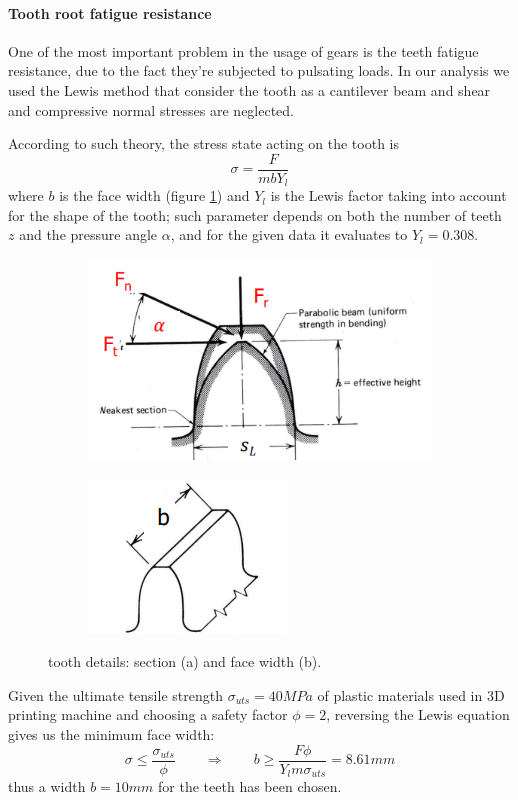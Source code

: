 	\paragraph{Tooth root fatigue resistance}	One of the most important problem in the usage of gears is the teeth fatigue resistance, due to the fact they're subjected to pulsating loads.  
	In our analysis we used the Lewis method that consider the tooth as a cantilever beam and shear and compressive normal stresses are neglected.
	
	According to such theory, the stress state acting on the tooth is
	\[ \sigma = \frac{F}{mb Y_l}\]
	where $b$ is the face width (figure \ref{fig:tooth}) and $Y_l$ is the Lewis factor taking into account for the shape of the tooth; such parameter depends on both the number of teeth $z$ and the pressure angle $\alpha$, and for the given data it evaluates to $Y_l = 0.308$.
	\begin{figure}[bt]
	\begin{subfigure}{.5\textwidth}
		\centering
		\includegraphics[scale=0.5]{Images/toothgear1.png}
		\caption{}
	\end{subfigure}%
	\begin{subfigure}{.5\textwidth}
		\centering
		\includegraphics[scale=0.6]{Images/toothgear2.png}
		\caption{}
	\end{subfigure}
	\caption{tooth details: section (a) and face width (b).}
	\label{fig:tooth}
	\end{figure}
	
	Given the ultimate tensile strength $\sigma_{uts} = 40MPa$ of plastic materials used in 3D printing machine and choosing a safety factor $\phi= 2$, reversing the Lewis equation gives us the minimum face width:
	\[ \sigma \leq \frac{\sigma_{uts}}{\phi} \qquad \Rightarrow \qquad b \geq \frac{F \phi}{Y_l m \sigma_{uts}} = 8.61mm \]
	thus a width $b = 10mm$ for the teeth has been chosen.
